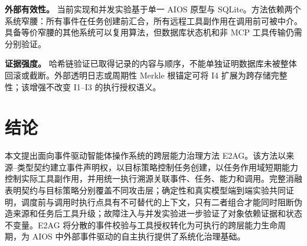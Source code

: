 \textbf{外部有效性。} 当前实现和并发实验基于单一 AIOS 原型与 SQLite。方法依赖两个系统窄腰：所有事件在任务创建前汇合，所有远程工具副作用在调用前可被中介。具备等价窄腰的其他系统可以复用算法，但数据库状态机和非 MCP 工具传输仍需分别验证。

\textbf{证据强度。} 哈希链验证已取得记录的内容与顺序，不能单独证明数据库未被整体回滚或截断。外部透明日志或周期性 Merkle 根锚定可将 I4 扩展为跨存储完整性；该增强不改变 I1--I3 的执行授权语义。

\section{结论}\label{sec:conclusion-v1}

本文提出面向事件驱动智能体操作系统的跨层能力治理方法 E2AG。该方法以来源--类型契约建立事件声明权，以目标策略控制任务创建，以任务作用域短期能力控制实际工具副作用，并用统一执行溯源关联事件、任务、能力和调用。完整消融表明契约与目标策略分别覆盖不同攻击层；确定性和真实模型端到端实验共同证明，调度前与调用时执行点具有不可替代的上下文，只有二者组合才能同时阻断伪造来源和任务后工具升级；故障注入与并发实验进一步验证了对象依赖证据和状态不变量。E2AG 将分散的事件校验与工具授权转化为可执行的跨层能力生命周期，为 AIOS 中外部事件驱动的自主执行提供了系统化治理基础。

